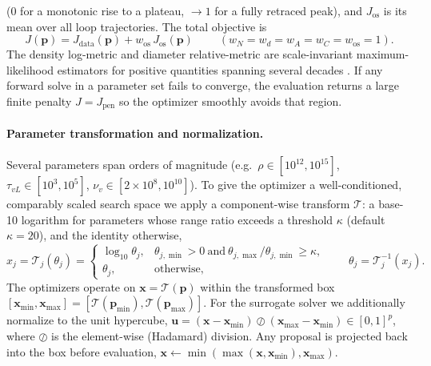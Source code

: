 \documentclass{article}
\newcommand{\param}{\bm{p}}
\newcommand{\xv}{\bm{x}}
\begin{document}
($0$ for a monotonic rise to a plateau, $\to 1$ for a fully retraced peak), and
$J_{\mathrm{os}}$ is its mean over all loop trajectories. The total objective is
\begin{equation}
  \;J(\param)=J_{\mathrm{data}}(\param)+w_{\mathrm{os}}\,J_{\mathrm{os}}(\param)\;
  \qquad (w_N=w_d=w_A=w_C=w_{\mathrm{os}}=1).
  \label{eq:objective}
\end{equation}
The density log-metric and diameter relative-metric are scale-invariant
maximum-likelihood estimators for positive quantities spanning several decades
\citep{Tarantola2005}. If any forward solve in a parameter set fails to converge,
the evaluation returns a large finite penalty $J=J_{\mathrm{pen}}$ so the
optimizer smoothly avoids that region.

\paragraph{Parameter transformation and normalization.}
Several parameters span orders of magnitude (e.g.\ $\rho\in[10^{12},10^{15}]$,
$\tau_{vL}\in[10^{3},10^{5}]$, $\nu_v\in[2\times10^{8},10^{10}]$). To give the
optimizer a well-conditioned, comparably scaled search space we apply a
component-wise transform $\mathcal{T}$: a base-10 logarithm for parameters whose
range ratio exceeds a threshold $\kappa$ (default $\kappa=20$), and the identity
otherwise,
\begin{equation}
  x_j=\mathcal{T}_j(\theta_j)=
  \begin{cases}
    \log_{10}\theta_j, & \theta_{j,\min}>0 \ \text{and}\ \theta_{j,\max}/\theta_{j,\min}\ge \kappa,\\[2pt]
    \theta_j, & \text{otherwise,}
  \end{cases}
  \qquad
  \theta_j=\mathcal{T}_j^{-1}(x_j).
  \label{eq:transform}
\end{equation}
The optimizers operate on $\xv=\mathcal{T}(\param)$ within the transformed box
$[\xv_{\min},\xv_{\max}]=[\mathcal{T}(\param_{\min}),\mathcal{T}(\param_{\max})]$.
For the surrogate solver we additionally normalize to the unit hypercube,
$\bm{u}=(\xv-\xv_{\min})\oslash(\xv_{\max}-\xv_{\min})\in[0,1]^{p}$, where $\oslash$
is the element-wise (Hadamard) division. Any proposal is projected back into the
box before evaluation, $\xv\leftarrow\min(\max(\xv,\xv_{\min}),\xv_{\max})$.

\end{document}
